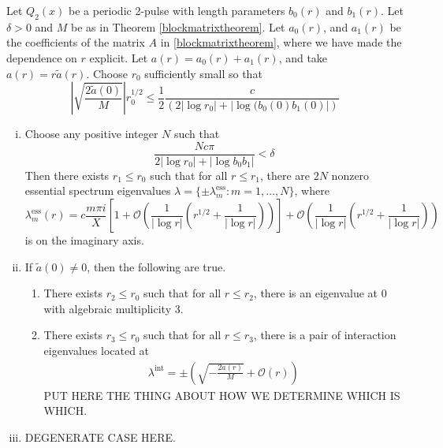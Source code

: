 \documentclass[thesis.tex]{subfiles}
\begin{document}
\begin{theorem}\label{theorem:2peigscase1}
Let $Q_2(x)$ be a periodic 2-pulse with length parameters $b_0(r)$ and $b_1(r)$. Let $\delta > 0$ and $M$ be as in Theorem \ref{blockmatrixtheorem}. Let $a_0(r)$, and $a_1(r)$ be the coefficients of the matrix $A$ in \ref{blockmatrixtheorem}, where we have made the dependence on $r$ explicit. Let $a(r) = a_0(r) + a_1(r)$, and take $a(r) = r \tilde{a}(r)$. Choose $r_0$ sufficiently small so that 
\begin{equation}\label{nobubblecond}
\left| \sqrt{\frac{2 \tilde{a}(0)}{M}}\right|r_0^{1/2} \leq \frac{1}{2} \frac{c}{\left( 2 |\log r_0| + |\log( b_0(0) b_1(0) |\right)}
\end{equation}

\begin{enumerate}[(i)]
\item Choose any positive integer $N$ such that
\[
\frac{N c \pi}{2 |\log r_0| + |\log b_0 b_1| } < \delta
\]
Then there exists $r_1 \leq r_0$ such that for all $r\leq r_1$, there are $2N$ nonzero essential spectrum eigenvalues $\lambda = \{ \pm \lambda_m^{\text{ess}} : m = 1, \dots, N\}$, where
\[
\lambda_m^{\text{ess}}(r) = c \frac{m \pi i}{X}\left[1 + \mathcal{O}\left( \frac{1}{|\log r|}\left( r^{1/2} + \frac{1}{|\log r|} \right) \right) \right] + \mathcal{O}\left( \frac{1}{|\log r|}\left( r^{1/2} + \frac{1}{|\log r|} \right) \right)
\]
is on the imaginary axis. 

\item If $\tilde{a}(0) \neq 0$, then the following are true.
\begin{enumerate}
	\item There exists $r_2 \leq r_0$ such that for all $r \leq r_2$, there is an eigenvalue at 0 with algebraic multiplicity 3.

	\item There exists $r_3 \leq r_0$ such that for all $r \leq r_3$, there is a pair of interaction eigenvalues located at
	\begin{align*}
	\lambda^{\text{int}} = \pm \left( \sqrt{-\frac{2 a(r)}{M}} + \mathcal{O}( r ) \right)
	\end{align*}
	PUT HERE THE THING ABOUT HOW WE DETERMINE WHICH IS WHICH.
\end{enumerate}
\item DEGENERATE CASE HERE.

\end{enumerate}
\end{theorem}
\end{document}
